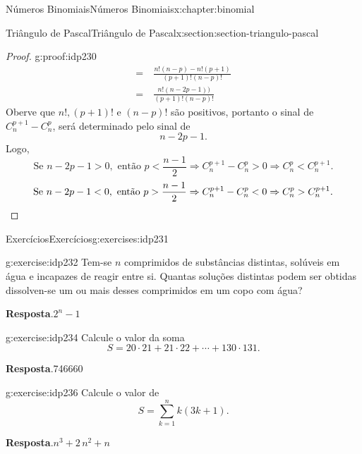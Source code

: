 \documentclass[oneside,10pt,]{book}
\newcommand{\blocktitlefont}{\relax}
\newcommand{\qedhere}{\relax}
\numberwithin{equation}{section}
\newcommand{\lt}{<}
\newcommand{\amp}{&}
\begin{document}
\begin{chapterptx}{Números Binomiais}{}{Números Binomiais}{}{}{x:chapter:binomial}
\begin{sectionptx}{Triângulo de Pascal}{}{Triângulo de Pascal}{}{}{x:section:section-triangulo-pascal}
\begin{proof}{}{g:proof:idp230}
\begin{align*}
= \amp ~ \frac{n!(n-p) - n!(p+1)}{(p+1)!(n-p)!}  \\
= \amp ~ \frac{n!(n-2p-1))}{(p+1)! (n-p)!}  
\end{align*}
Oberve que \(n!, (p+1)!\) e \((n-p)!\) são positivos, portanto o sinal de \(C_n^{p+1}-C_n^p\), será determinado pelo sinal de%
\begin{equation*}
n-2p-1.
\end{equation*}
Logo,%
\begin{equation*}
\text{Se } n-2p-1>0, \text{ então } p\lt\frac{n-1}{2} \Rightarrow C_n^{p+1}-C_n^{p}>0 \Rightarrow C_n^{p}\lt C_n^{p+1}. 
\end{equation*}
%
\begin{equation*}
\text{Se } n-2p-1\lt 0, \text{ então } p>\frac{n-1}{2} \Rightarrow C_n^{p+1}-C_n^{p}\lt 0 \Rightarrow C_n^{p}>C_n^{p+1}.   \qedhere
\end{equation*}
%
\end{proof}
%
%
\typeout{************************************************}
\typeout{************************************************}
%
\begin{exercises-subsection}{Exercícios}{}{Exercícios}{}{}{g:exercises:idp231}
\begin{divisionexercise}{1}{}{}{g:exercise:idp232}%
Tem-se \(n\) comprimidos de substâncias distintas, solúveis em água e incapazes de reagir entre si. Quantas soluções distintas podem ser obtidas dissolven-se um ou mais desses comprimidos em um copo com água?%
\par\smallskip%
\noindent\textbf{\blocktitlefont Resposta}.\hypertarget{g:answer:idp233}{}\quad{}\(2^n-1\)%
\end{divisionexercise}%
\begin{divisionexercise}{2}{}{}{g:exercise:idp234}%
Calcule o valor da soma%
\begin{equation*}
S = 20\cdot21 + 21\cdot 22 +\cdots + 130\cdot 131.
\end{equation*}
%
\par\smallskip%
\noindent\textbf{\blocktitlefont Resposta}.\hypertarget{g:answer:idp235}{}\quad{}746660%
\end{divisionexercise}%
\begin{divisionexercise}{3}{}{}{g:exercise:idp236}%
Calcule o valor de%
\begin{equation*}
S = \sum_{k=1}^{n}k(3k+1).
\end{equation*}
%
\par\smallskip%
\noindent\textbf{\blocktitlefont Resposta}.\hypertarget{g:answer:idp237}{}\quad{}\(n^{3} + 2 \, n^{2} + n\)%

\end{divisionexercise}
\end{exercises-subsection}
\end{sectionptx}
\end{chapterptx}
\end{document}
